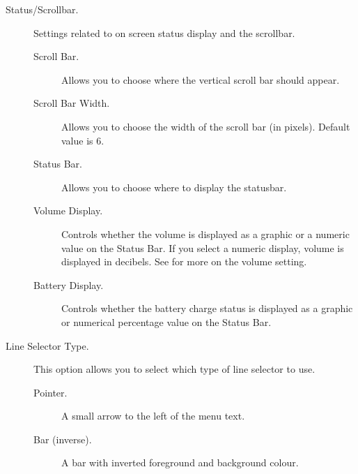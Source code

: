 \begin{description}
%
\item[Status/Scrollbar.]
  Settings related to on screen status display and the scrollbar.
  \begin{description}
  \item[Scroll Bar.] Allows you to choose where the vertical scroll bar
    should appear.
  \item[Scroll Bar Width.] Allows you to choose the width of the
    scroll bar (in pixels).  Default value is 6.
  \item[Status Bar.] Allows you to choose where to display the 
    statusbar. 
  \item[Volume Display.] Controls whether the volume is displayed as a
    graphic or a numeric value on the Status Bar. If you select a numeric
    display, volume is displayed in decibels.  See 
    for more on the volume setting.
  \item[Battery Display.] Controls whether the battery charge status is
    displayed as a graphic or numerical percentage value on the Status Bar.
  \end{description}
%
\item[Line Selector Type.]
  This option allows you to select which type of line selector to use.
  \begin{description}
    \item[Pointer.]
      A small arrow to the left of the menu text.
    \item[Bar (inverse).]
      A bar with inverted foreground and background colour.
  \end{description}


\end{description}
